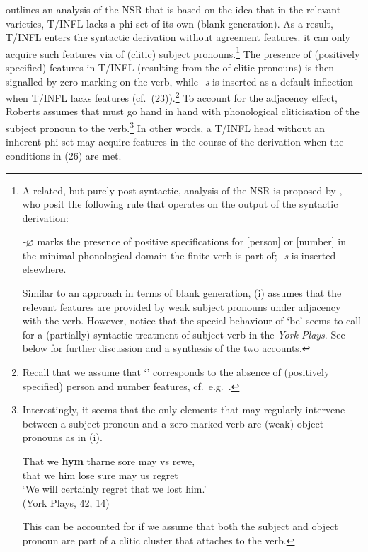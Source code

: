 \documentclass[output=paper]{langsci/langscibook}
\begin{document}
\textcite{Roberts:2010} outlines an analysis of the \gls{NSR} that is based on
the idea that in the relevant varieties, T/INFL lacks a phi-set of its own
(blank generation). As a result, T/INFL enters the syntactic derivation without
agreement features. it can only acquire such features via  of
(clitic) subject pronouns.\footnote{A related, but purely
    post-syntactic, analysis of the \gls{NSR} is
    proposed by \citealp{TripsFuss:2010}, who posit the following
     rule that operates on the output of the syntactic
    derivation:

    \begin{exe}
         \emph{-$\varnothing$} marks the presence of positive specifications for [person] or [number] in the minimal phonological domain the finite verb is part of; \emph{-s} is inserted elsewhere.
    \end{exe}
    Similar to an approach in terms of blank generation, (i) assumes that the
    relevant  features are provided by weak subject pronouns
    under adjacency with the verb. However, notice that the special behaviour
    of `be' seems to call for a (partially) syntactic treatment of subject-verb
     in the \emph{York Plays}. See below for further discussion
    and a synthesis of the two accounts.} The presence of (positively
    specified)  features in T/INFL (resulting from the
     of clitic pronouns) is then signalled by zero marking
    on the verb, while \emph{-s} is inserted as a default inflection when
    T/INFL lacks  features (cf.\ (23)).\footnote{Recall that we
        assume that `\Tsg{}' corresponds to the absence of (positively
        specified) person and number features, cf.\ e.g.\
        \cite{Harleyritter:2002}.\label{fn:10.38}} To account for the adjacency effect, Roberts assumes that  must go hand in hand with phonological cliticisation of the subject pronoun to the verb.\footnote{Interestingly, it seems that the only elements that may regularly intervene between a subject pronoun and a zero-marked verb are (weak) object pronouns as in (i).

    \begin{exe}
        \gll That we \textbf{hym} tharne sore may vs rewe,\\
        that we him lose sure may us regret\\
        \glt `We will certainly regret that we lost him.'\\
        (York Plays, 42, 14)
    \end{exe}
This can be accounted for if we assume that both the subject and object pronoun
are part of a clitic cluster that attaches to the verb.} In other words, a
T/INFL head without an inherent phi-set may acquire \isi{agreement} features in
the course of the derivation when the conditions in (26) are met.
\end{document}
